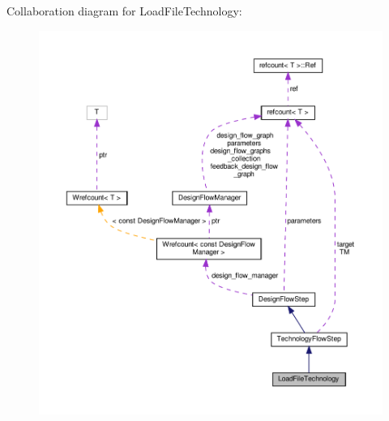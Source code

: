 Collaboration diagram for Load\+File\+Technology\+:
\nopagebreak
\begin{figure}[H]
\begin{center}
\leavevmode
\includegraphics[width=350pt]{d5/dd2/classLoadFileTechnology__coll__graph}
\end{center}
\end{figure}
